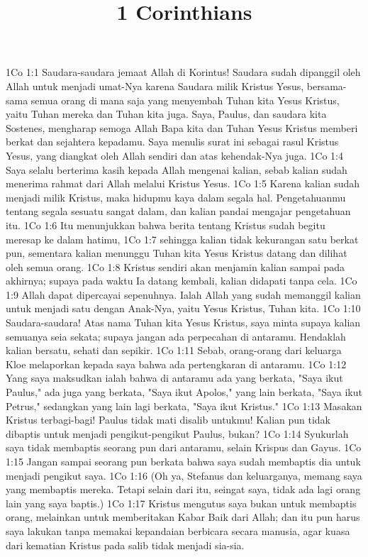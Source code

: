 

\title{1 Corinthians}

1Co 1:1  Saudara-saudara jemaat Allah di Korintus! Saudara sudah dipanggil oleh Allah untuk menjadi umat-Nya karena Saudara milik Kristus Yesus, bersama-sama semua orang di mana saja yang menyembah Tuhan kita Yesus Kristus, yaitu Tuhan mereka dan Tuhan kita juga. Saya, Paulus, dan saudara kita Sostenes, mengharap semoga Allah Bapa kita dan Tuhan Yesus Kristus memberi berkat dan sejahtera kepadamu. Saya menulis surat ini sebagai rasul Kristus Yesus, yang diangkat oleh Allah sendiri dan atas kehendak-Nya juga.
1Co 1:4  Saya selalu berterima kasih kepada Allah mengenai kalian, sebab kalian sudah menerima rahmat dari Allah melalui Kristus Yesus.
1Co 1:5  Karena kalian sudah menjadi milik Kristus, maka hidupmu kaya dalam segala hal. Pengetahuanmu tentang segala sesuatu sangat dalam, dan kalian pandai mengajar pengetahuan itu.
1Co 1:6  Itu menunjukkan bahwa berita tentang Kristus sudah begitu meresap ke dalam hatimu,
1Co 1:7  sehingga kalian tidak kekurangan satu berkat pun, sementara kalian menunggu Tuhan kita Yesus Kristus datang dan dilihat oleh semua orang.
1Co 1:8  Kristus sendiri akan menjamin kalian sampai pada akhirnya; supaya pada waktu Ia datang kembali, kalian didapati tanpa cela.
1Co 1:9  Allah dapat dipercayai sepenuhnya. Ialah Allah yang sudah memanggil kalian untuk menjadi satu dengan Anak-Nya, yaitu Yesus Kristus, Tuhan kita.
1Co 1:10  Saudara-saudara! Atas nama Tuhan kita Yesus Kristus, saya minta supaya kalian semuanya seia sekata; supaya jangan ada perpecahan di antaramu. Hendaklah kalian bersatu, sehati dan sepikir.
1Co 1:11  Sebab, orang-orang dari keluarga Kloe melaporkan kepada saya bahwa ada pertengkaran di antaramu.
1Co 1:12  Yang saya maksudkan ialah bahwa di antaramu ada yang berkata, "Saya ikut Paulus," ada juga yang berkata, "Saya ikut Apolos," yang lain berkata, "Saya ikut Petrus," sedangkan yang lain lagi berkata, "Saya ikut Kristus."
1Co 1:13  Masakan Kristus terbagi-bagi! Paulus tidak mati disalib untukmu! Kalian pun tidak dibaptis untuk menjadi pengikut-pengikut Paulus, bukan?
1Co 1:14  Syukurlah saya tidak membaptis seorang pun dari antaramu, selain Krispus dan Gayus.
1Co 1:15  Jangan sampai seorang pun berkata bahwa saya sudah membaptis dia untuk menjadi pengikut saya.
1Co 1:16  (Oh ya, Stefanus dan keluarganya, memang saya yang membaptis mereka. Tetapi selain dari itu, seingat saya, tidak ada lagi orang lain yang saya baptis.)
1Co 1:17  Kristus mengutus saya bukan untuk membaptis orang, melainkan untuk memberitakan Kabar Baik dari Allah; dan itu pun harus saya lakukan tanpa memakai kepandaian berbicara secara manusia, agar kuasa dari kematian Kristus pada salib tidak menjadi sia-sia.

